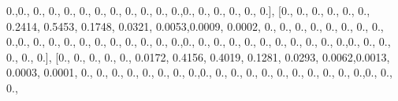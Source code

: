 \documentclass[
]{book}
\newenvironment{Shaded}{\begin{snugshade}}{\end{snugshade}}
\newcommand{\FloatTok}[1]{\textcolor[rgb]{0.00,0.00,0.81}{#1}}
\newcommand{\NormalTok}[1]{#1}
\begin{document}
\begin{Shaded}
\begin{Highlighting}[]
\FloatTok{0.}\NormalTok{,}\FloatTok{0.}\NormalTok{, }\FloatTok{0.}\NormalTok{, }\FloatTok{0.}\NormalTok{, }\FloatTok{0.}\NormalTok{, }\FloatTok{0.}\NormalTok{, }\FloatTok{0.}\NormalTok{, }\FloatTok{0.}\NormalTok{, }\FloatTok{0.}\NormalTok{, }\FloatTok{0.}\NormalTok{, }\FloatTok{0.}\NormalTok{, }\FloatTok{0.}\NormalTok{,}\FloatTok{0.}\NormalTok{, }\FloatTok{0.}\NormalTok{, }\FloatTok{0.}\NormalTok{, }\FloatTok{0.}\NormalTok{, }\FloatTok{0.}\NormalTok{, }\FloatTok{0.}\NormalTok{], [}\FloatTok{0.}\NormalTok{, }\FloatTok{0.}\NormalTok{,}
\FloatTok{0.}\NormalTok{, }\FloatTok{0.}\NormalTok{, }\FloatTok{0.}\NormalTok{, }\FloatTok{0.}\NormalTok{, }\FloatTok{0.2414}\NormalTok{, }\FloatTok{0.5453}\NormalTok{, }\FloatTok{0.1748}\NormalTok{, }\FloatTok{0.0321}\NormalTok{, }\FloatTok{0.0053}\NormalTok{,}\FloatTok{0.0009}\NormalTok{, }\FloatTok{0.0002}\NormalTok{, }\FloatTok{0.}\NormalTok{, }\FloatTok{0.}\NormalTok{,}
\FloatTok{0.}\NormalTok{, }\FloatTok{0.}\NormalTok{, }\FloatTok{0.}\NormalTok{, }\FloatTok{0.}\NormalTok{, }\FloatTok{0.}\NormalTok{, }\FloatTok{0.}\NormalTok{, }\FloatTok{0.}\NormalTok{,}\FloatTok{0.}\NormalTok{, }\FloatTok{0.}\NormalTok{, }\FloatTok{0.}\NormalTok{, }\FloatTok{0.}\NormalTok{, }\FloatTok{0.}\NormalTok{, }\FloatTok{0.}\NormalTok{, }\FloatTok{0.}\NormalTok{, }\FloatTok{0.}\NormalTok{, }\FloatTok{0.}\NormalTok{, }\FloatTok{0.}\NormalTok{, }\FloatTok{0.}\NormalTok{,}\FloatTok{0.}\NormalTok{, }\FloatTok{0.}\NormalTok{,}
\FloatTok{0.}\NormalTok{, }\FloatTok{0.}\NormalTok{, }\FloatTok{0.}\NormalTok{, }\FloatTok{0.}\NormalTok{, }\FloatTok{0.}\NormalTok{, }\FloatTok{0.}\NormalTok{, }\FloatTok{0.}\NormalTok{, }\FloatTok{0.}\NormalTok{, }\FloatTok{0.}\NormalTok{,}\FloatTok{0.}\NormalTok{, }\FloatTok{0.}\NormalTok{, }\FloatTok{0.}\NormalTok{, }\FloatTok{0.}\NormalTok{, }\FloatTok{0.}\NormalTok{, }\FloatTok{0.}\NormalTok{], [}\FloatTok{0.}\NormalTok{, }\FloatTok{0.}\NormalTok{, }\FloatTok{0.}\NormalTok{, }\FloatTok{0.}\NormalTok{, }\FloatTok{0.}\NormalTok{,}
\FloatTok{0.0172}\NormalTok{, }\FloatTok{0.4156}\NormalTok{, }\FloatTok{0.4019}\NormalTok{, }\FloatTok{0.1281}\NormalTok{, }\FloatTok{0.0293}\NormalTok{, }\FloatTok{0.0062}\NormalTok{,}\FloatTok{0.0013}\NormalTok{, }\FloatTok{0.0003}\NormalTok{, }\FloatTok{0.0001}\NormalTok{, }\FloatTok{0.}\NormalTok{, }\FloatTok{0.}\NormalTok{,}
\FloatTok{0.}\NormalTok{, }\FloatTok{0.}\NormalTok{, }\FloatTok{0.}\NormalTok{, }\FloatTok{0.}\NormalTok{, }\FloatTok{0.}\NormalTok{, }\FloatTok{0.}\NormalTok{,}\FloatTok{0.}\NormalTok{, }\FloatTok{0.}\NormalTok{, }\FloatTok{0.}\NormalTok{, }\FloatTok{0.}\NormalTok{, }\FloatTok{0.}\NormalTok{, }\FloatTok{0.}\NormalTok{, }\FloatTok{0.}\NormalTok{, }\FloatTok{0.}\NormalTok{, }\FloatTok{0.}\NormalTok{, }\FloatTok{0.}\NormalTok{, }\FloatTok{0.}\NormalTok{,}\FloatTok{0.}\NormalTok{, }\FloatTok{0.}\NormalTok{, }\FloatTok{0.}\NormalTok{,}

\end{Highlighting}
\end{Shaded}
\end{document}
